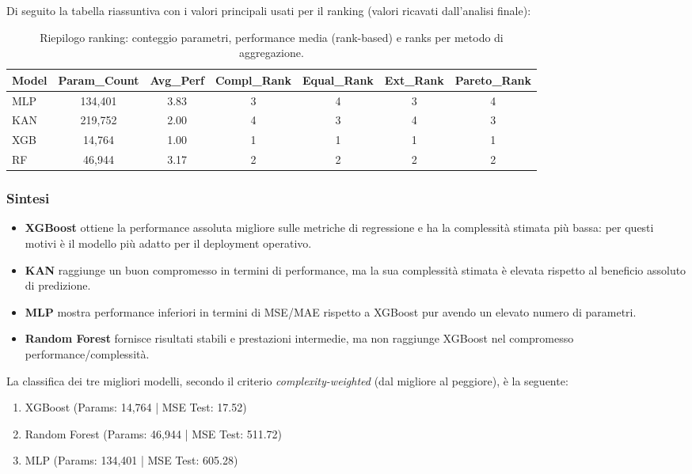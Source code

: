 \documentclass[a4paper,12pt]{report}
\begin{document}
	Di seguito la tabella riassuntiva con i valori principali usati per il ranking (valori ricavati dall'analisi finale):
	
	\begin{table}[H]
		\centering
		\setlength{\tabcolsep}{2pt}
		\small
		\begin{tabular}{lcccccc}
			\toprule
			\textbf{Model} & \textbf{Param\_Count} & \textbf{Avg\_Perf} & \textbf{Compl\_Rank} & \textbf{Equal\_Rank} & \textbf{Ext\_Rank} & \textbf{Pareto\_Rank} \\
			\midrule
			MLP           & 134,401 & 3.83 & 3 & 4 & 3 & 4 \\
			KAN           & 219,752 & 2.00 & 4 & 3 & 4 & 3 \\
			XGB 		  & 14,764  & 1.00 & 1 & 1 & 1 & 1 \\
			RF 			  & 46,944  & 3.17 & 2 & 2 & 2 & 2 \\
			\bottomrule
		\end{tabular}
		\caption{Riepilogo ranking: conteggio parametri, performance media (rank-based) e ranks per metodo di aggregazione.}
	\end{table}
	
	\subsubsection{Sintesi}
	\begin{itemize}
		\item \textbf{XGBoost} ottiene la performance assoluta migliore sulle metriche di regressione e ha la complessità stimata più bassa: per questi motivi è il modello più adatto per il deployment operativo.
		\item \textbf{KAN} raggiunge un buon compromesso in termini di performance, ma la sua complessità stimata è elevata rispetto al beneficio assoluto di predizione.
		\item \textbf{MLP} mostra performance inferiori in termini di MSE/MAE rispetto a XGBoost pur avendo un elevato numero di parametri.
		\item \textbf{Random Forest} fornisce risultati stabili e prestazioni intermedie, ma non raggiunge XGBoost nel compromesso performance/complessità.
	\end{itemize}
	
	La classifica dei tre migliori modelli, secondo il criterio \emph{complexity-weighted} (dal migliore al peggiore), è la seguente:
	\begin{enumerate}
		\item XGBoost \quad (Params: 14{,}764 \;|\; MSE Test: 17.52)
		\item Random Forest \quad (Params: 46{,}944 \;|\; MSE Test: 511.72)
		\item MLP \quad (Params: 134{,}401 \;|\; MSE Test: 605.28)
	\end{enumerate}
	
\end{document}
